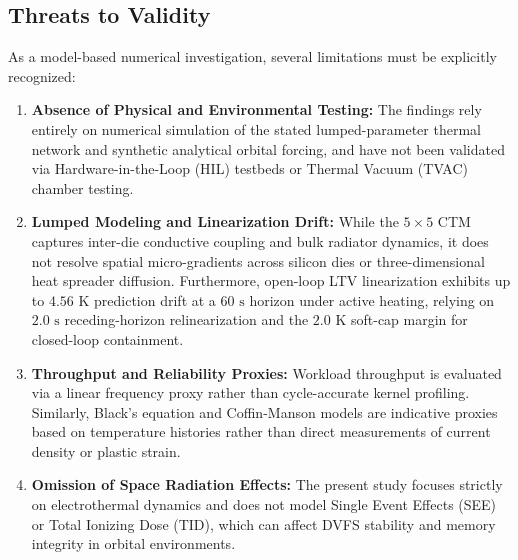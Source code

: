 \documentclass[a4paper,fleqn]{cas-dc}
\begin{document}
\subsection{Threats to Validity}
As a model-based numerical investigation, several limitations must be explicitly recognized:
\begin{enumerate}
\item \textbf{Absence of Physical and Environmental Testing:} The findings rely entirely on numerical simulation of the stated lumped-parameter thermal network and synthetic analytical orbital forcing, and have not been validated via Hardware-in-the-Loop (HIL) testbeds or Thermal Vacuum (TVAC) chamber testing.
\item \textbf{Lumped Modeling and Linearization Drift:} While the $5\times5$ CTM captures inter-die conductive coupling and bulk radiator dynamics, it does not resolve spatial micro-gradients across silicon dies or three-dimensional heat spreader diffusion. Furthermore, open-loop LTV linearization exhibits up to $4.56\text{ K}$ prediction drift at a $60\text{ s}$ horizon under active heating, relying on $2.0\text{ s}$ receding-horizon relinearization and the $2.0\text{ K}$ soft-cap margin for closed-loop containment.
\item \textbf{Throughput and Reliability Proxies:} Workload throughput is evaluated via a linear frequency proxy rather than cycle-accurate kernel profiling. Similarly, Black's equation and Coffin-Manson models are indicative proxies based on temperature histories rather than direct measurements of current density or plastic strain.
\item \textbf{Omission of Space Radiation Effects:} The present study focuses strictly on electrothermal dynamics and does not model Single Event Effects (SEE) or Total Ionizing Dose (TID), which can affect DVFS stability and memory integrity in orbital environments.
\end{enumerate}
\end{document}
